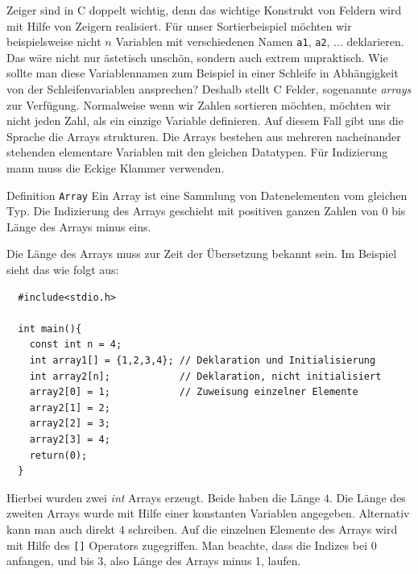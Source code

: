 Zeiger sind in C doppelt wichtig, denn das wichtige Konstrukt von Feldern wird mit Hilfe von Zeigern realisiert. 
Für unser Sortierbeispiel möchten wir beispielsweise nicht $n$ Variablen mit verschiedenen Namen \verb|a1|, \verb|a2|, ... deklarieren.
Das wäre nicht nur ästetisch unschön, sondern auch extrem unpraktisch.
Wie sollte man diese Variablennamen zum Beispiel in einer Schleife in Abhängigkeit von der Schleifenvariablen ansprechen?
Deshalb stellt C Felder, sogenannte \emph{arrays} zur Verfügung.
Normalweise wenn wir Zahlen sortieren möchten, möchten wir nicht jeden Zahl, als
ein einzige Variable definieren. Auf diesem Fall gibt uns die Sprache die Arrays 
strukturen. Die Arrays bestehen aus mehreren nacheinander stehenden elementare 
Variablen mit den gleichen Datatypen. Für Indizierung mann muss
die Eckige Klammer verwenden. 
\begin{myblock}{Definition \texttt{Array}}
Ein Array ist eine Sammlung von Datenelementen vom gleichen Typ. Die 
Indizierung des Arrays geschieht mit positiven ganzen Zahlen von 0 bis Länge des Arrays minus eins.
\end{myblock}
Die Länge des Arrays muss zur Zeit der Übersetzung bekannt sein.
Im Beispiel sieht das wie folgt aus: 
\begin{lstlisting}
  #include<stdio.h>
  
  int main(){
    const int n = 4;
    int array1[] = {1,2,3,4}; // Deklaration und Initialisierung
    int array2[n];            // Deklaration, nicht initialisiert
    array2[0] = 1;            // Zuweisung einzelner Elemente
    array2[1] = 2;
    array2[2] = 3;
    array2[3] = 4;
    return(0);
  }
\end{lstlisting}
Hierbei wurden zwei \emph{int} Arrays erzeugt.
Beide haben die Länge $4$.
Die Länge des zweiten Arrays wurde mit Hilfe einer konstanten Variablen angegeben.
Alternativ kann man auch direkt $4$ schreiben.
Auf die einzelnen Elemente des Arrays wird mit Hilfe des \verb|[]| Operators zugegriffen.
Man beachte, dass die Indizes bei $0$ anfangen, und bis $3$, also Länge des Arrays minus 1, laufen. 

